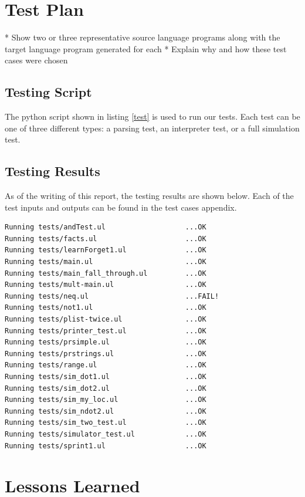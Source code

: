 \documentclass[onecolumn,titlepage]{article}
\begin{document}
\section{Test Plan}

    * Show two or three representative source language programs along with the target language program generated for each
    * Explain why and how these test cases were chosen

\subsection{Testing Script}
The python script shown in listing \ref{test} is used to run our
tests.  Each test can be one of three different types: a parsing test,
an interpreter test, or a full simulation test.

\lstset{caption=Testing Script,label=test}


\subsection{Testing Results}
As of the writing of this report, the testing results are shown
below.  Each of the test inputs and outputs can be found in the test
cases appendix.

\begin{verbatim}
Running tests/andTest.ul                   ...OK
Running tests/facts.ul                     ...OK
Running tests/learnForget1.ul              ...OK
Running tests/main.ul                      ...OK
Running tests/main_fall_through.ul         ...OK
Running tests/mult-main.ul                 ...OK
Running tests/neq.ul                       ...FAIL!
Running tests/not1.ul                      ...OK
Running tests/plist-twice.ul               ...OK
Running tests/printer_test.ul              ...OK
Running tests/prsimple.ul                  ...OK
Running tests/prstrings.ul                 ...OK
Running tests/range.ul                     ...OK
Running tests/sim_dot1.ul                  ...OK
Running tests/sim_dot2.ul                  ...OK
Running tests/sim_my_loc.ul                ...OK
Running tests/sim_ndot2.ul                 ...OK
Running tests/sim_two_test.ul              ...OK
Running tests/simulator_test.ul            ...OK
Running tests/sprint1.ul                   ...OK
\end{verbatim}


\section{Lessons Learned}
\end{document}
